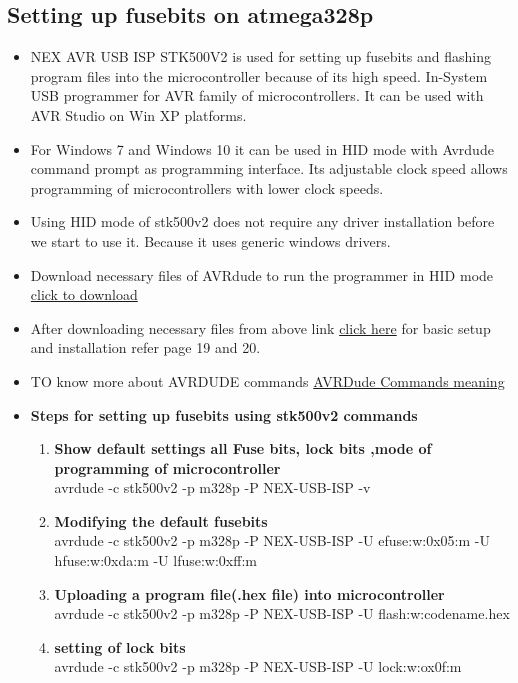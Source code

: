 \documentclass[a4paper,12pt,oneside]{book}
\begin{document}
\subsection*{Setting up fusebits on atmega328p}
\begin{itemize}
\item NEX AVR USB ISP STK500V2 is used for setting up fusebits and flashing program files into the microcontroller because of its high speed.
In-System USB programmer for AVR family of microcontrollers. It can be used with
AVR Studio on Win XP platforms. 
\item For Windows 7 and Windows 10 it can be used in HID
mode with Avrdude command prompt as programming interface. Its adjustable clock
speed allows programming of microcontrollers with lower clock speeds. 

\item Using HID mode of stk500v2 does not require any driver installation before we start to use it. 
Because it uses generic windows drivers.
\item Download necessary files of AVRdude to run the programmer in HID mode \href{http://www.nex-robotics.com/images/downloads/NEX\%20AVR\%20STK500V2.zip}{click to download}
\item After downloading necessary files from above link \href{http://www.nex-robotics.com/images/downloads/avr\%20usb\%20programmer\%20manualv2_.pdf}{click here} for basic setup and installation refer page 19 and 20.
\item TO know more about AVRDUDE commands 
\href{https://drive.google.com/file/d/1mJsKZGY1hJlm7xWhdA7beEfMs0qJASh_/view}{AVRDude Commands meaning}
\item \textbf{Steps for setting up fusebits using stk500v2 commands}

\begin{enumerate}
\item \textbf{Show default settings all Fuse bits, lock bits ,mode of programming of microcontroller}\\
 avrdude -c stk500v2 -p m328p -P NEX-USB-ISP -v
 \item \textbf{Modifying the default fusebits}\\
 avrdude -c stk500v2 -p m328p -P NEX-USB-ISP -U efuse:w:0x05:m -U hfuse:w:0xda:m -U lfuse:w:0xff:m
 \item \textbf{Uploading a program file(.hex file) into microcontroller}\\
 avrdude -c stk500v2 -p m328p -P NEX-USB-ISP -U flash:w:codename.hex
  \item \textbf{setting of lock bits}\\
 avrdude -c stk500v2 -p m328p -P NEX-USB-ISP -U lock:w:ox0f:m

\end{enumerate}

\end{itemize}
\end{document}
